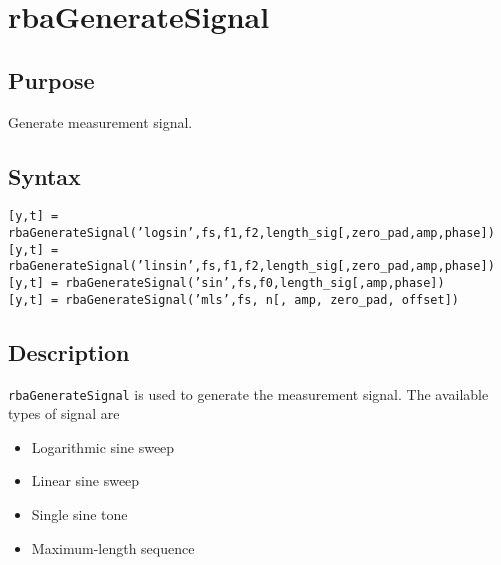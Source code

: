 
\chapter{rbaGenerateSignal} %
\label{cha:rbaGenerateSignal} %

\section{Purpose} %
\label{sec:rbaGenerateSignal_purpose}
Generate measurement signal.



\section{Syntax} %
\label{sec:rbaGenerateSignal_syntax}

\texttt{[y,t] = rbaGenerateSignal('logsin',fs,f1,f2,length\_sig[,zero\_pad,amp,phase])} \\
\texttt{[y,t] = rbaGenerateSignal('linsin',fs,f1,f2,length\_sig[,zero\_pad,amp,phase])} \\
\texttt{[y,t] = rbaGenerateSignal('sin',fs,f0,length\_sig[,amp,phase])} \\
\texttt{[y,t] = rbaGenerateSignal('mls',fs, n[, amp, zero\_pad, offset])} \\





\section{Description} %
\label{sec:rbaGenerateSignal_description}
\texttt{rbaGenerateSignal} is used to generate the measurement signal. The available types of signal are
\begin{itemize}
    \item Logarithmic sine sweep
    \item Linear sine sweep
    \item Single sine tone
    \item Maximum-length sequence
\end{itemize}

